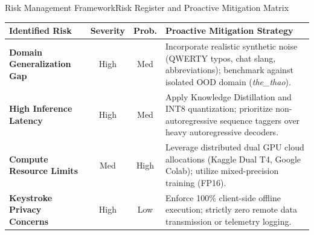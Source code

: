 \documentclass[aspectratio=169,10pt]{beamer}
\begin{document}
\begin{frame}{Risk Management Framework}{Risk Register and Proactive Mitigation Matrix}
  \begin{table}[H]
    \centering
    \footnotesize
    \renewcommand{\arraystretch}{1.15}
    \begin{tabularx}{\textwidth}{p{3.2cm} c c X}
      \toprule
      \textbf{Identified Risk} & \textbf{Severity} & \textbf{Prob.} & \textbf{Proactive Mitigation Strategy} \\
      \midrule
      \textbf{Domain Generalization Gap} & High & Med & Incorporate realistic synthetic noise (QWERTY typos, chat slang, abbreviations); benchmark against isolated OOD domain (\textit{the\_thao}). \\
      \midrule
      \textbf{High Inference Latency} & High & Med & Apply Knowledge Distillation and INT8 quantization; prioritize non-autoregressive sequence taggers over heavy autoregressive decoders. \\
      \midrule
      \textbf{Compute Resource Limits} & Med & High & Leverage distributed dual GPU cloud allocations (Kaggle Dual T4, Google Colab); utilize mixed-precision training (FP16). \\
      \midrule
      \textbf{Keystroke Privacy Concerns} & High & Low & Enforce 100\% client-side offline execution; strictly zero remote data transmission or telemetry logging. \\
      \bottomrule
    \end{tabularx}
  \end{table}
\end{frame}
\end{document}
